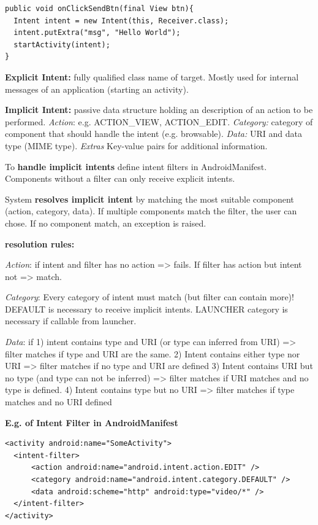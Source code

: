 \begin{lstlisting}
public void onClickSendBtn(final View btn){
  Intent intent = new Intent(this, Receiver.class);
  intent.putExtra("msg", "Hello World");
  startActivity(intent);
}
\end{lstlisting}

\textbf{Explicit Intent:} fully qualified class name of target. Mostly used for
internal messages of an application (starting an activity).

\textbf{Implicit Intent:} passive data structure holding an description of an
action to be performed. \textit{Action}: e.g. ACTION\_VIEW, ACTION\_EDIT.
\textit{Category:} category of component that should handle the intent (e.g.
browsable). \textit{Data:} URI and data type (MIME type). \textit{Extras}
Key-value pairs for additional information.

To \textbf{handle implicit intents} define intent filters in AndroidManifest.
Components without a filter can only receive explicit intents.

System \textbf{resolves implicit intent} by matching the most suitable
component (action, category, data). If multiple components match the filter,
the user can chose. If no component match, an exception is raised.

\textbf{resolution rules:}

\textit{Action}: if intent and filter has no action => fails. If filter has
action but intent not => match.

\textit{Category}: Every category of intent must match (but filter can contain
more)! DEFAULT is necessary to receive implicit intents. LAUNCHER category is
necessary if callable from launcher.

\textit{Data}: if 1) intent contains type and URI (or type can inferred from
URI) => filter matches if type and URI are the same.
2) Intent contains either type nor URI => filter matches if no type and URI are
defined
3) Intent contains URI but no type (and type can not be inferred) => filter
matches if URI matches and no type is defined.
4) Intent contains type but no URI => filter matches if type matches and no URI defined


\textbf{E.g. of Intent Filter in AndroidManifest}
\begin{lstlisting}
<activity android:name="SomeActivity">
  <intent-filter>
      <action android:name="android.intent.action.EDIT" />
      <category android:name="android.intent.category.DEFAULT" />
      <data android:scheme="http" android:type="video/*" />
  </intent-filter>
</activity>
\end{lstlisting}

